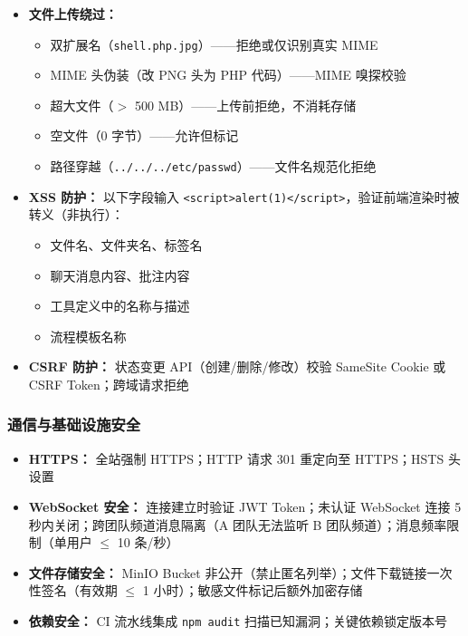 \documentclass[a4paper,zihao=-4]{ctexart}
\begin{document}
\begin{itemize}
  \item \textbf{文件上传绕过：}
        \begin{itemize}
          \item 双扩展名（\texttt{shell.php.jpg}）——拒绝或仅识别真实 MIME
          \item MIME 头伪装（改 PNG 头为 PHP 代码）——MIME 嗅探校验
          \item 超大文件（$>$ 500 MB）——上传前拒绝，不消耗存储
          \item 空文件（0 字节）——允许但标记
          \item 路径穿越（\texttt{../../../etc/passwd}）——文件名规范化拒绝
        \end{itemize}
  \item \textbf{XSS 防护：} 以下字段输入
        \texttt{<script>alert(1)</script>}，验证前端渲染时被转义（非执行）：
        \begin{itemize}
          \item 文件名、文件夹名、标签名
          \item 聊天消息内容、批注内容
          \item 工具定义中的名称与描述
          \item 流程模板名称
        \end{itemize}
  \item \textbf{CSRF 防护：} 状态变更 API（创建/删除/修改）校验 SameSite Cookie 或 CSRF
        Token；跨域请求拒绝
\end{itemize}

\subsubsection{通信与基础设施安全}

\begin{itemize}
  \item \textbf{HTTPS：} 全站强制 HTTPS；HTTP 请求 301 重定向至 HTTPS；HSTS 头设置
  \item \textbf{WebSocket 安全：} 连接建立时验证 JWT Token；未认证 WebSocket 连接 5
        秒内关闭；跨团队频道消息隔离（A 团队无法监听 B 团队频道）；消息频率限制（单用户 $\leq$ 10 条/秒）
  \item \textbf{文件存储安全：} MinIO Bucket 非公开（禁止匿名列举）；文件下载链接一次性签名（有效期 $\leq$ 1
        小时）；敏感文件标记后额外加密存储
  \item \textbf{依赖安全：} CI 流水线集成 \texttt{npm audit}
        扫描已知漏洞；关键依赖锁定版本号
\end{itemize}
\end{document}
